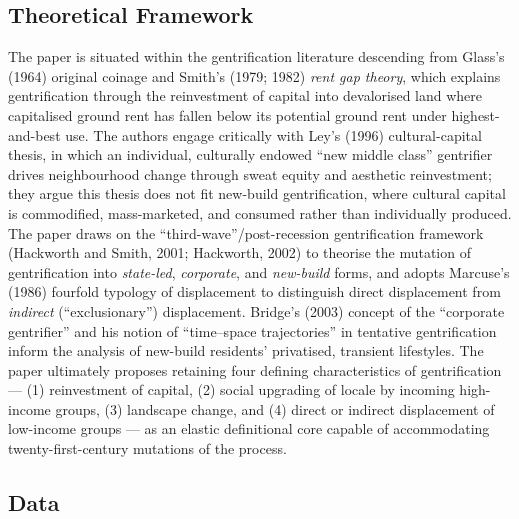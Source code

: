 \subsection*{Theoretical Framework}

The paper is situated within the gentrification literature descending from Glass's (1964) original coinage and Smith's (1979; 1982) \emph{rent gap theory}, which explains gentrification through the reinvestment of capital into devalorised land where capitalised ground rent has fallen below its potential ground rent under highest-and-best use. The authors engage critically with Ley's (1996) cultural-capital thesis, in which an individual, culturally endowed ``new middle class'' gentrifier drives neighbourhood change through sweat equity and aesthetic reinvestment; they argue this thesis does not fit new-build gentrification, where cultural capital is commodified, mass-marketed, and consumed rather than individually produced. The paper draws on the ``third-wave''/post-recession gentrification framework (Hackworth and Smith, 2001; Hackworth, 2002) to theorise the mutation of gentrification into \emph{state-led}, \emph{corporate}, and \emph{new-build} forms, and adopts Marcuse's (1986) fourfold typology of displacement to distinguish direct displacement from \emph{indirect} (``exclusionary'') displacement. Bridge's (2003) concept of the ``corporate gentrifier'' and his notion of ``time--space trajectories'' in tentative gentrification inform the analysis of new-build residents' privatised, transient lifestyles. The paper ultimately proposes retaining four defining characteristics of gentrification --- (1) reinvestment of capital, (2) social upgrading of locale by incoming high-income groups, (3) landscape change, and (4) direct or indirect displacement of low-income groups --- as an elastic definitional core capable of accommodating twenty-first-century mutations of the process.

\subsection*{Data}

